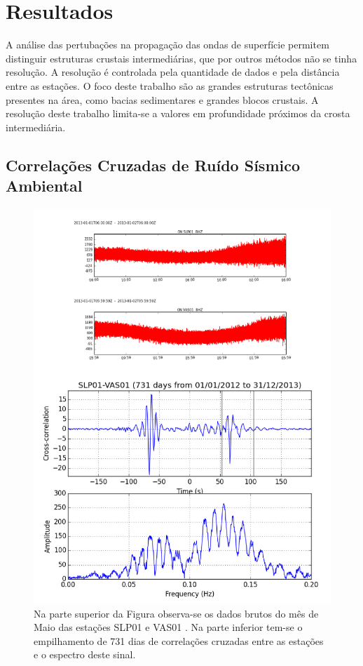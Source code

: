 \section{Resultados}

A análise das pertubações na propagação das ondas de superfície permitem distinguir estruturas crustais intermediárias, que por outros métodos não se tinha resolução. A resolução é controlada pela quantidade de dados e pela distância entre as estações. O foco deste trabalho são as grandes estruturas tectônicas presentes na área, como bacias sedimentares e grandes blocos crustais. A resolução deste trabalho limita-se a valores em profundidade próximos da crosta intermediária.

\subsection{Correlações Cruzadas de Ruído Sísmico Ambiental}

\begin{figure}[!ht]
\centering
\includegraphics[scale=0.5]{Figs/corr_dado_bruto.png}
\caption[Dados Brutos das estações SLP01 e VAS01 e a correlação dos mesmos.]{Na parte superior da Figura observa-se os dados brutos do mês de Maio das estações SLP01 e VAS01 . Na parte inferior tem-se o empilhamento de 731 dias de correlações cruzadas entre as estações e o espectro deste sinal.}
\label{corr_dado_bruto}
\end{figure}

